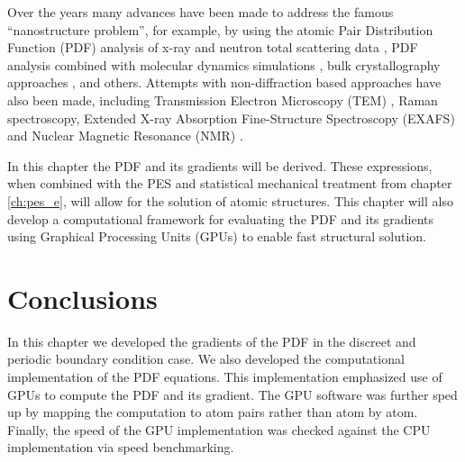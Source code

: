 Over the years many advances have been made to address the famous ``nanostructure problem''\cite{Billinge2007a}, for example, by using the atomic Pair Distribution Function (PDF) analysis of x-ray and neutron total scattering data \cite{Farrow2007, Page2011, Proffen1997}, PDF analysis combined with molecular dynamics simulations \cite{Zhang2008, Gilbert2013}, bulk crystallography approaches \cite{Jadzinsky2007}, and others.
Attempts with non-diffraction based approaches have also been made,  including Transmission Electron Microscopy (TEM) \cite{Cui2013},
Raman spectroscopy\cite{Kassiba2002}, Extended X-ray Absorption Fine-Structure Spectroscopy (EXAFS)\cite{Frenkel2007} and Nuclear Magnetic Resonance (NMR) \cite{Arnold2013}.

In this chapter the PDF and its gradients will be derived.
These expressions, when combined with the PES and statistical mechanical treatment from chapter \ref{ch:pes_e}, will allow for the solution of atomic structures.
This chapter will also develop a computational framework for evaluating the PDF and its gradients using Graphical Processing Units (GPUs) to enable fast structural solution.





\section{Conclusions}
In this chapter we developed the gradients of the PDF in the discreet and periodic boundary condition case.
We also developed the computational implementation of the PDF equations.
This implementation emphasized use of GPUs to compute the PDF and its gradient.
The GPU software was further sped up by mapping the computation to atom pairs rather than atom by atom.
Finally, the speed of the GPU implementation was checked against the CPU implementation via speed benchmarking.
